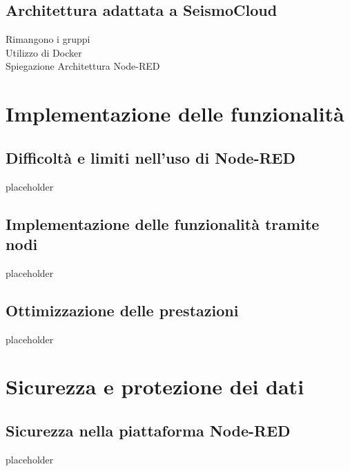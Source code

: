 \documentclass[a4paper,10pt]{memoir}
\begin{document}
\section{Architettura adattata a SeismoCloud}

Rimangono i gruppi
\\
Utilizzo di Docker
\\
Spiegazione Architettura Node-RED
\\

\clearpage

\chapter{Implementazione delle funzionalità}

\section{Difficoltà e limiti nell'uso di Node-RED}

placeholder

\clearpage

\section{Implementazione delle funzionalità tramite nodi}

placeholder

\clearpage

\section{Ottimizzazione delle prestazioni}

placeholder

\clearpage

\chapter{Sicurezza e protezione dei dati}

\section{Sicurezza nella piattaforma Node-RED}

placeholder
\end{document}
